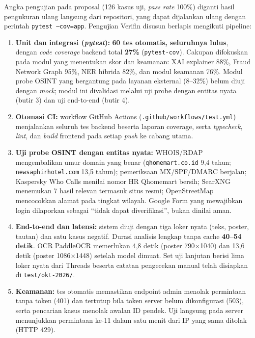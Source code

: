 \documentclass[12pt,a4paper]{article}
\newenvironment{sorotkuning}{%
  \begin{tcolorbox}[
    breakable,
    enhanced,
    frame hidden,
    boxrule=0pt,
    arc=0mm,
    sharp corners,
    colback=yellow!22,
    left=1.5mm, right=1.5mm, top=1.0mm, bottom=1.0mm,
    before skip=1.5pt, after skip=1.5pt
  ]%
}{%
  \end{tcolorbox}%
}
\begin{document}
\begin{sorotkuning}
Angka pengujian pada proposal (126 kasus uji, \textit{pass rate} 100\%) diganti hasil pengukuran ulang langsung dari
repositori, yang dapat dijalankan ulang dengan perintah \texttt{pytest --cov=app}. Pengujian Verifin disusun berlapis mengikuti pipeline:

\begin{enumerate}[label=\textbf{\arabic*.}]
\item \textbf{Unit dan integrasi (\textit{pytest}):} \textbf{60 tes otomatis, seluruhnya lulus}, dengan
      \textit{code coverage} backend total \textbf{27\%} (\texttt{pytest-cov}). Cakupan difokuskan pada modul yang
      menentukan skor dan keamanan: XAI explainer 88\%, Fraud Network Graph 95\%, NER hibrida 82\%, dan modul keamanan 76\%.
      Modul probe OSINT yang bergantung pada layanan eksternal (8--32\%) belum diuji dengan \textit{mock}; modul ini
      divalidasi melalui uji probe dengan entitas nyata (butir 3) dan uji end-to-end (butir 4).
\item \textbf{Otomasi CI:} workflow GitHub Actions (\texttt{.github/workflows/test.yml}) menjalankan seluruh tes backend
      beserta laporan coverage, serta \textit{typecheck}, \textit{lint}, dan \textit{build} frontend pada setiap
      \textit{push} ke cabang utama.
\item \textbf{Uji probe OSINT dengan entitas nyata:} WHOIS/RDAP mengembalikan umur domain yang benar
      (\texttt{qhomemart.co.id} 9,4 tahun; \texttt{newsaphirhotel.com} 13,5 tahun); pemeriksaan MX/SPF/DMARC berjalan;
      Kaspersky Who Calls menilai nomor HR Qhomemart bersih; SearXNG menemukan 7 hasil relevan termasuk situs resmi;
      OpenStreetMap mencocokkan alamat pada tingkat wilayah. Google Form yang mewajibkan login dilaporkan sebagai
      ``tidak dapat diverifikasi'', bukan dinilai aman.
\item \textbf{End-to-end dan latensi:} sistem diuji dengan tiga loker nyata (teks, poster, tautan)
      dan satu kasus negatif. Durasi analisis lengkap tanpa cache \textbf{40--54 detik}. OCR PaddleOCR memerlukan
      4,8 detik (poster 790$\times$1040) dan 13,6 detik (poster 1086$\times$1448) setelah model dimuat.
      Set uji lanjutan berisi lima loker nyata dari Threads beserta catatan pengecekan manual telah
      disiapkan di \texttt{test/okt-2026/}.
\item \textbf{Keamanan:} tes otomatis memastikan endpoint admin menolak permintaan tanpa token (401) dan tertutup bila
      token server belum dikonfigurasi (503), serta pencarian kasus menolak awalan ID pendek. Uji langsung pada server
      menunjukkan permintaan ke-11 dalam satu menit dari IP yang sama ditolak (HTTP 429).
\end{enumerate}


\end{sorotkuning}
\end{document}
